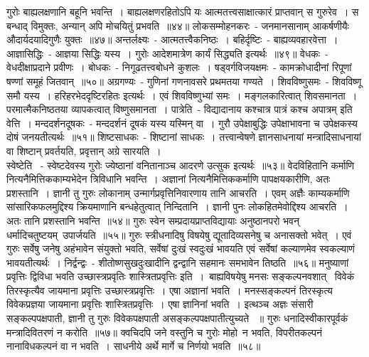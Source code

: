\indent  गुरोः बाह्यलक्षणानि बहूनि भवन्ति~। बाह्यलक्षणरहितोऽपि यः आत्मतत्त्वसाक्षात्कारं प्राप्तवान् स गुरुरेव~। स  बन्धाद् विमुक्तः, अन्यान् अपि मोचयितुं प्रभवति~॥४४॥
\indent  लोकसम्मोहनकरः~- जनमानसानाम् आकर्षणीयैः औदार्यदयादिगुणैः युक्तः~॥४७॥
\indent अन्तर्लक्ष्यः~- आत्मतत्त्वैकनिष्ठः~। बहिर्दृष्टिः~- बाह्यव्यवहारवेत्ता~। आज्ञासिद्धिः~- आज्ञया सिद्धिः यस्य~। गुरोः आदेशमात्रेण कार्यं सिद्ध्यति इत्यर्थः~॥४९॥
\indent  वेधकः~- वेधदीक्षाप्रदाने प्रवीणः~। बोधकः~- निगूढतत्त्वबोधने कुशलः~। षड्वर्गविजयक्षमः~- कामक्रोधादीनां रिपूणां षण्णां समूहं जितवान्~॥५०॥
\indent   अग्रगण्यः~- गुणिनां गणनावसरे प्रथमतया गण्यते~।   शिवविष्णुसमः~- शिवविष्णू समौ यस्य~। हरिहरभेददृष्टिरहितः इत्यर्थः~। एवं शिवविष्णुभ्यां समः~। मङ्गलकारित्वात् शिवसमानता~। परमात्मैकनिष्ठतया  व्यापकत्वात् विष्णुसमानता~। पात्रेति~- विद्यादानाय कश्चात्र पात्रं  कश्च अपात्रम् इति वेत्ति~। मन्ददर्शनदूषकः~- मन्ददर्शनं दूषकं यस्य यस्मिन् वा~। गुरौ उपेक्षाबुद्धिः उपेक्षाभावना च उपेक्षकस्य दोषं जनयतीत्यर्थः~॥५१॥
\indent  शिष्टसाधकः~- शिष्टानां साधकः~। तत्त्वान्वेषणे ज्ञानसाधनायां मन्त्रादिसाधनायां वा शिष्टान् प्रवर्तयति, प्रवृत्तान् अग्रे सारयति~।\\ \indent स्वेष्टेति ~- स्वेष्टदेवस्य गुरोः  ज्येष्ठानां वनितानाञ्च आदरणे उत्सुक इत्यर्थः~॥५३॥
\indent  वेदविहितानि कर्माणि नित्यनैमित्तिककाम्यभेदेन त्रिविधानि भवन्ति~। अज्ञानां  नित्यनैमित्तिककर्माणि पापक्षयकारीणि, अतः प्रशस्तानि~। ज्ञानी तु गुरुः लोकानाम् उन्मार्गप्रवृत्तिनिवारणाय तानि आचरति~।  एवम् अज्ञैः काम्यकर्माणि सांसारिकफलमुद्दिश्य क्रियमाणानि बन्धहेतुत्वात् निन्दितानि~। ज्ञानी पुनः लोकहितमेवोद्दिश्य आचरति~। अतः तानि प्रशस्तानि भवन्ति~॥५४॥
\indent   गुरुः स्वेन सम्प्रदायप्राप्तविद्यायाः अनुष्ठानपरो भवन् धर्मादिचतुष्टयम्\footB\ उपार्जयति~॥५५॥
\indent    गुरुः स्त्रीधनादिषु विषयेषु द्यूतादिव्यसनेषु च अनासक्तो भवेत्~। एवं  गुरुः सर्वेषु जनेषु अहंभावेन संयुक्तो भवति, सर्वेषां दुःखं स्वदुःखं भावयति एवं सर्वेषां कल्याणमेव स्वकल्याणं भावयतीत्यर्थः~। निर्द्वन्द्वः~- शीतोष्णसुखदुःखादीनि द्वन्द्वानि सहमानः समभावेन तिष्ठति~॥५६॥
\indent  मनुष्याणां प्रवृत्तिः द्विविधा भवति उच्छास्त्रप्रवृतिः शास्त्रितप्रवृत्तिः इति~।\footB\ बाह्यविषयेषु  मनसः सङ्कल्पनवशात् \footB\  विवेकं  तिरस्कृत्यैव जायमाना प्रवृत्तिः उच्छास्त्रप्रवृत्तिः~। एषा अज्ञानां भवति~।   मनस्सङ्कल्पनं तिरस्कृत्य विवेकप्रज्ञया जायमाना प्रवृत्तिः शास्त्रितप्रवृत्तिः~। एषा ज्ञानिनां भवति~। इत्थञ्च अज्ञः संसारी सङ्कल्पपक्षपाती, ज्ञानी तु गुरुः विवेकपक्षपाती असङ्कल्पपक्षपातीत्युच्यते ~॥ गुरुः धनादिस्वीकारपूर्वकं मन्त्रादिवितरणं न करोति~॥५७॥
\indent    क्वचिदपि जने वस्तुनि च गुरोः मोहो\footB\ न भवति, विपरीतकल्पनं नानाविधकल्पनं वा न भवति~। साधनीये अर्थे मार्गे च निर्णयो भवति~॥५८॥
